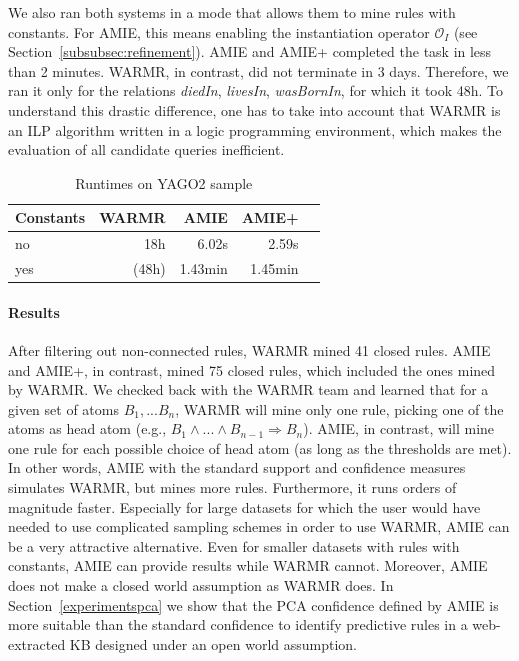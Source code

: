 We also ran both systems in a mode that allows them to mine rules with constants. 
For AMIE, this means enabling the instantiation operator $\mathcal{O}_I$ (see Section~\ref{subsubsec:refinement}).
AMIE and AMIE+ completed the task in less than 2 minutes. WARMR, in contrast, did not terminate in 3 days.
Therefore, we ran it only for the relations \textit{diedIn}, \textit{livesIn}, \textit{wasBornIn}, for which it took 48h. 
To understand this drastic difference, one has to take into account that WARMR is an ILP algorithm written in a logic programming environment, 
which makes the evaluation of all candidate queries inefficient.

\begin{table}
\begin{tabular}{l|rr rr|}
Constants 	& WARMR 		& AMIE 		& AMIE+\\
\hline
 no 		& 18h 			& 6.02s 	& 2.59s \\
 yes 		& (48h) 	 	& 1.43min  	& 1.45min\\
\end{tabular}
\caption{Runtimes on YAGO2 sample}
\label{warmrruntime}
\end{table}


\paragraph{Results} After filtering out non-connected rules, WARMR mined 41 closed rules. 
AMIE and AMIE+, in contrast, mined 75 closed rules, which included the ones mined by WARMR.
We checked back with the WARMR team and learned that for a given set of atoms $B_1, ... B_n$, 
WARMR will mine only one rule,
picking one of the atoms as head atom (e.g., $B_1 \wedge ... \wedge B_{n-1} \Rightarrow B_n$).
AMIE, in contrast, will mine one rule for each possible choice of head atom (as long as the thresholds are met).
In other words, AMIE with the standard support and confidence measures simulates WARMR, but mines more rules.
Furthermore, it runs orders of magnitude faster. 
Especially for large datasets for which the user would have needed to use complicated sampling schemes in order to use WARMR,
AMIE can be a very attractive alternative.
Even for smaller datasets with rules with constants, AMIE can provide results while WARMR cannot.
Moreover, AMIE does not make a closed world assumption as WARMR does. 
In Section~\ref{experimentspca} we show that the PCA confidence defined by AMIE
is more suitable than the standard confidence to identify predictive rules in a web-extracted KB designed under
an open world assumption.


